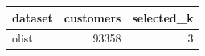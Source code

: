 \begin{tabular}{lrr}
\toprule
dataset & customers & selected_k \\
\midrule
olist & 93358 & 3 \\
\bottomrule
\end{tabular}
